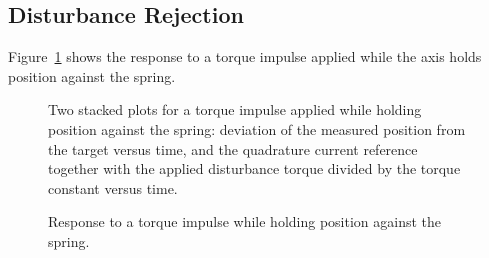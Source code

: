 
\subsection{Disturbance Rejection}\label{sec:expDisturbance}

Figure~\ref{fig:impulse_response} %
shows the response to a torque impulse applied while the axis holds position against the spring. %
\begin{figure}[htbp]
	\centering
		{Two stacked plots for a torque impulse applied while holding position against the spring: deviation of the measured position from the target versus time, and the quadrature current reference together with the applied disturbance torque divided by the torque constant versus time.}
	\caption[Response to a torque impulse]{Response to a torque impulse while holding position against the spring.}
	\label{fig:impulse_response}
\end{figure}

